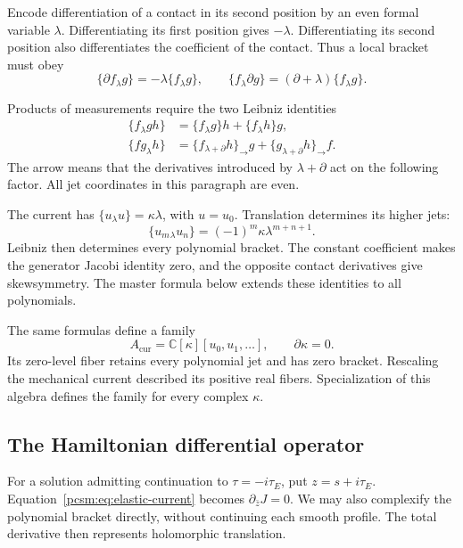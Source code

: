 Encode\label{pcsm:def:contact-translation} differentiation of a contact in its second position by an
even formal variable \(\lambda\).
Differentiating its first position gives \(-\lambda\).
Differentiating its second position also differentiates the coefficient
of the contact. Thus a local bracket must obey
\[
 \{\partial f_\lambda g\}=-\lambda\{f_\lambda g\},\qquad
 \{f_\lambda\partial g\}=(\partial+\lambda)\{f_\lambda g\}.
\]

Products of measurements require the two Leibniz identities
\begin{align*}
 \{f_\lambda gh\}&=\{f_\lambda g\}h+\{f_\lambda h\}g,\\
 \{fg_\lambda h\}&=\{f_{\lambda+\partial}h\}_{\to}g
                    +\{g_{\lambda+\partial}h\}_{\to}f.
\end{align*}
The arrow means that the derivatives introduced by
\(\lambda+\partial\) act on the following factor.
All jet coordinates in this paragraph are even.

The current has \(\{u_\lambda u\}=\kappa\lambda\), with \(u=u_0\).
Translation determines its higher jets:
\begin{equation}\label{pcsm:eq:current-jet-response}
 \{u_m{}_{\lambda}u_n\}=(-1)^m\kappa\lambda^{m+n+1}.
\end{equation}
Leibniz then determines every polynomial bracket.
The constant coefficient makes the generator Jacobi identity zero,
and the opposite contact derivatives give skewsymmetry.
The master formula below extends these identities to all polynomials.

The same formulas define a family
\[
 A_{\mathrm{cur}}=\mathbb C[\kappa][u_0,u_1,\ldots],
 \qquad \partial\kappa=0.
\]
Its zero-level fiber retains every polynomial jet and has zero bracket.
Rescaling the mechanical current described its positive real fibers.
Specialization of this algebra defines the family for every complex
\(\kappa\).

\subsection{The Hamiltonian differential operator}

For\label{pcsm:def:holomorphic-coordinate} a solution admitting continuation to \(\tau=-i\tau_E\), put
\(z=s+i\tau_E\).
Equation~\eqref{pcsm:eq:elastic-current} becomes
\(\partial_{\bar z}J=0\).
We may also complexify the polynomial bracket directly, without
continuing each smooth profile. The total derivative then represents
holomorphic translation.

